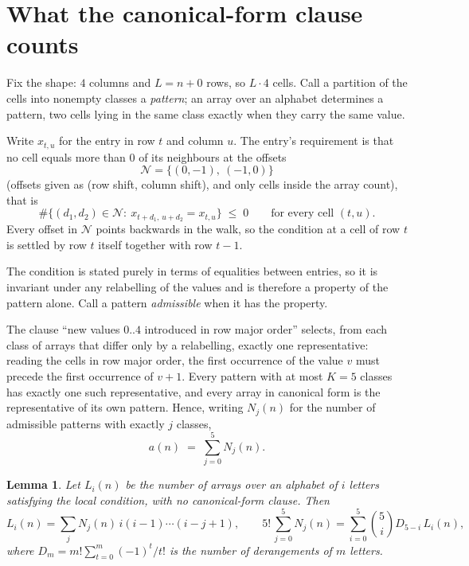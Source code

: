\documentclass[11pt,a4paper]{article}
\theoremstyle{plain}
\newtheorem{lemma}[theorem]{Lemma}
\theoremstyle{definition}
\begin{document}
\section{What the canonical-form clause counts}

Fix the shape: $4$ columns and $L=n+0$ rows, so $L\cdot4$ cells. Call a
partition of the cells into nonempty classes a \emph{pattern}; an array over an alphabet
determines a pattern, two cells lying in the same class exactly when they carry the same
value.

Write $x_{t,u}$ for the entry in row $t$ and column $u$. The
entry's requirement is that no cell equals more than $0$ of its neighbours at the
offsets
\[
\mathcal N=\{(0,-1),\ (-1,0)\}
\]
(offsets given as (row shift, column shift), and only cells inside the array count),
that is
\begin{equation}\label{eq:loc}
\#\bigl\{(d_1,d_2)\in\mathcal N:\ x_{t+d_1,\,u+d_2}=x_{t,u}\bigr\}\;\le\;0
\qquad\text{for every cell }(t,u).
\end{equation}
Every offset in $\mathcal N$ points backwards in the walk, so the condition at a cell of
row $t$ is settled by row $t$ itself together with row $t-1$.

The condition is stated purely in terms of equalities between entries, so it is invariant
under any relabelling of the values and is therefore a property of the pattern alone. Call a
pattern \emph{admissible} when it has the property.

The clause ``new values $0..4$ introduced in row major order'' selects, from each class
of arrays that differ only by a relabelling, exactly one representative: reading the cells in
row major order, the first occurrence of the value $v$ must precede the first occurrence of
$v+1$. Every pattern with at most $K=5$ classes has exactly one such representative, and
every array in canonical form is the representative of its own pattern. Hence, writing
$N_j(n)$ for the number of admissible patterns with exactly $j$ classes,
\begin{equation}\label{eq:apat}
a(n)\;=\;\sum_{j=0}^{5}N_j(n).
\end{equation}

\begin{lemma}\label{lem:inv}
Let $L_i(n)$ be the number of arrays over an alphabet of $i$ letters satisfying the local
condition, with no canonical-form clause. Then
\[
L_i(n)=\sum_j N_j(n)\,i(i-1)\cdots(i-j+1),
\qquad
5!\,\sum_{j=0}^{5}N_j(n)=\sum_{i=0}^{5}\binom{5}{i}D_{5-i}\,L_i(n),
\]
where $D_m=m!\sum_{t=0}^{m}(-1)^t/t!$ is the number of derangements of $m$ letters.
\end{lemma}
\end{document}
